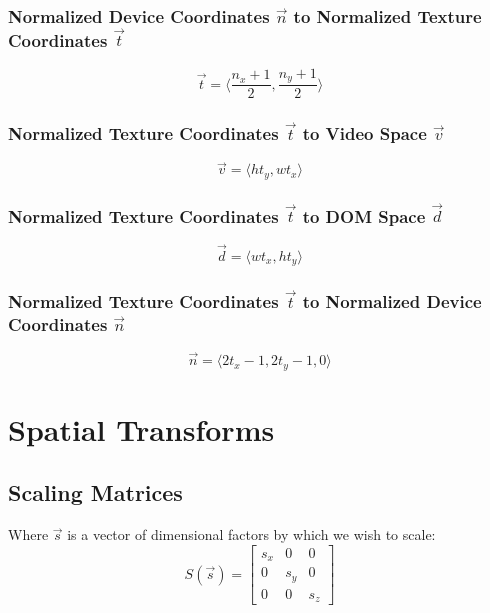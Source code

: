\subsubsection{Normalized Device Coordinates $\vec{n}$ to Normalized Texture Coordinates $\vec{t}$}
\begin{equation}
    \vec{t} = \langle \frac{n_x + 1}{2}, \frac{n_y + 1}{2} \rangle
\end{equation}

\subsubsection{Normalized Texture Coordinates $\vec{t}$ to Video Space $\vec{v}$}
\begin{equation}
    \vec{v} = \langle ht_y, wt_x \rangle
\end{equation}

\subsubsection{Normalized Texture Coordinates $\vec{t}$ to DOM Space $\vec{d}$}
\begin{equation}
    \vec{d} = \langle wt_x, ht_y \rangle
\end{equation}

\subsubsection{Normalized Texture Coordinates $\vec{t}$ to Normalized Device Coordinates $\vec{n}$}
\begin{equation}
    \vec{n} = \langle 2t_x - 1, 2t_y - 1, 0 \rangle
\end{equation}


\section{Spatial Transforms}

\subsection{Scaling Matrices}
Where $\vec{s}$ is a vector of dimensional factors by which we wish to scale:
\begin{equation}
S(\vec{s}) =
\begin{bmatrix}
    s_{x} & 0 & 0 \\
    0 & s_{y} & 0 \\
    0 & 0 & s_{z}
\end{bmatrix}
\end{equation}

